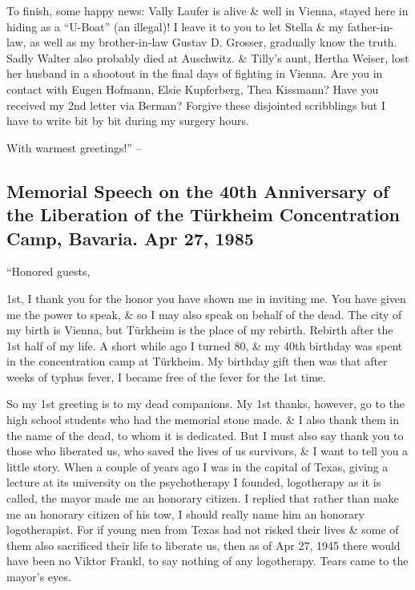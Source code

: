 \documentclass{article}
\numberwithin{equation}{section}
\begin{document}
To finish, some happy news: Vally Laufer is alive \& well in Vienna, stayed here in hiding as a ``U-Boat'' (an illegal)! I leave it to you to let Stella \& my father-in-law, as well as my brother-in-law Gustav D. Grosser, gradually know the truth. Sadly Walter also probably died at Auschwitz. \& Tilly's aunt, Hertha Weiser, lost her husband in a shootout in the final days of fighting in Vienna. Are you in contact with Eugen Hofmann, Elsie Kupferberg, Thea Kissmann? Have you received my 2nd letter via Berman? Forgive these disjointed scribblings but I have to write bit by bit during my surgery hours.

With warmest greetings!'' -- \cite[pp. 118--119]{Frankl2017}

\subsection{Memorial Speech on the 40th Anniversary of the Liberation of the T\"urkheim Concentration Camp, Bavaria. Apr 27, 1985}
``Honored guests,

1st, I thank you for the honor you have shown me in inviting me. You have given me the power to speak, \& so I may also speak on behalf of the dead. The city of my birth is Vienna, but T\"urkheim is the place of my rebirth. Rebirth after the 1st half of my life. A short while ago I turned 80, \& my 40th birthday was spent in the concentration camp at T\"urkheim. My birthday gift then was that after weeks of typhus fever, I became free of the fever for the 1st time.

So my 1st greeting is to my dead companions. My 1st thanks, however, go to the high school students who had the memorial stone made. \& I also thank them in the name of the dead, to whom it is dedicated. But I must also say thank you to those who liberated us, who saved the lives of us survivors, \& I want to tell you a little story. When a couple of years ago I was in the capital of Texas, giving a lecture at its university on the psychotherapy I founded, logotherapy as it is called, the mayor made me an honorary citizen. I replied that rather than make me an honorary citizen of his tow, I should really name him an honorary logotherapist. For if young men from Texas had not risked their lives \& some of them also sacrificed their life to liberate us, then as of Apr 27, 1945 there would have been no Viktor Frankl, to say nothing of any logotherapy. Tears came to the mayor's eyes.
\end{document}
